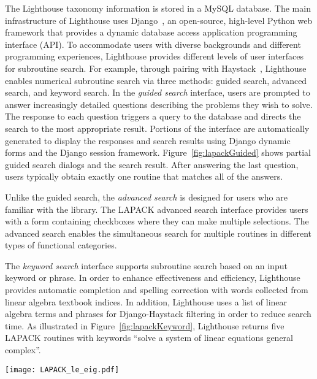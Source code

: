 \documentclass{sig-alternate}
\begin{document}
The Lighthouse taxonomy information is stored in a MySQL database. The main infrastructure of Lighthouse uses Django~\cite{django:Online},
an open-source, high-level Python web framework that provides a dynamic database access application programming interface (API).
To accommodate users with diverse backgrounds and different programming experiences, Lighthouse provides different levels of user interfaces for
subroutine search. For example, through pairing with Haystack~\cite{haystack:Online}, Lighthouse enables numerical 
subroutine search via three methods:
guided search, advanced search, and keyword search. In the \emph{guided search} interface, users are prompted to answer increasingly detailed
questions describing the problems they wish to solve. The response to each question triggers a 
query to the database and directs
the search to the most appropriate result. Portions of the interface are automatically generated to display the responses and search results
using Django dynamic forms and the Django session framework. Figure~\ref{fig:lapackGuided} shows partial guided search dialogs and the
search result. After answering the last question, users typically obtain exactly one routine that matches all of the answers.

Unlike the guided search, the \emph{advanced search} is designed for users who are familiar with the library. The LAPACK advanced search interface
provides users with a form containing checkboxes where they can make multiple selections. The advanced search enables the simultaneous
search for multiple routines in different types of functional categories.

The \emph{keyword search} interface supports subroutine search based on an input keyword or phrase. 
In order to enhance effectiveness and efficiency, Lighthouse provides automatic completion and spelling correction
with words collected from linear algebra textbook indices. In addition, Lighthouse uses a list of linear algebra terms and phrases for
Django-Haystack filtering in order to reduce search time.
As illustrated in Figure~\ref{fig:lapackKeyword}, Lighthouse returns five LAPACK routines with keywords ``solve a system of linear equations
general complex''.

\begin{figure*}
\centering
\texttt{[image: LAPACK\_le\_eig.pdf]}
\vspace{-5pt}
\caption{Guided search dialogs in the Lighthouse LAPACK prototype: The first question of a \emph{linear solver} search (left), and 
the result from a completed \emph{eigen} search that shows all questions and user's answers (right).}
\label{fig:lapackGuided}
\end{figure*}
\end{document}
